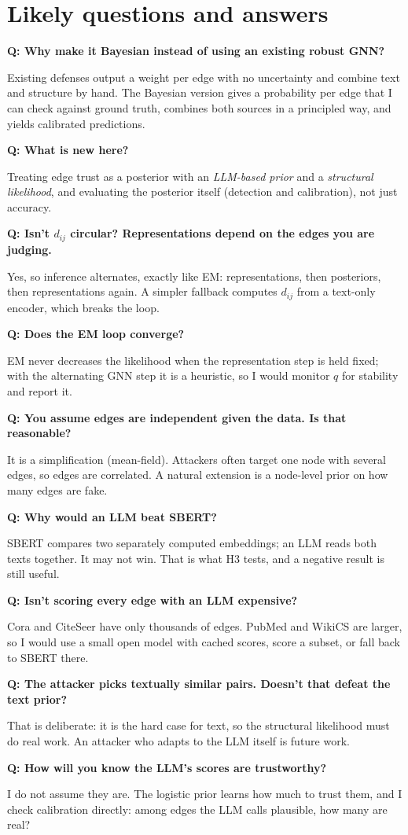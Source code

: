 \documentclass[11pt]{article}
\newcommand{\q}[1]{\par\medskip\noindent\textbf{\color{accent}Q: #1}\par\noindent}
\begin{document}
\section{Likely questions and answers}

\q{Why make it Bayesian instead of using an existing robust GNN?}
Existing defenses output a weight per edge with no uncertainty and combine text and structure
by hand. The Bayesian version gives a probability per edge that I can check against ground
truth, combines both sources in a principled way, and yields calibrated predictions.

\q{What is new here?}
Treating edge trust as a posterior with an \emph{LLM-based prior} and a \emph{structural
likelihood}, and evaluating the posterior itself (detection and calibration), not just
accuracy.

\q{Isn't $d_{ij}$ circular? Representations depend on the edges you are judging.}
Yes, so inference alternates, exactly like EM: representations, then posteriors, then
representations again. A simpler fallback computes $d_{ij}$ from a text-only encoder, which
breaks the loop.

\q{Does the EM loop converge?}
EM never decreases the likelihood when the representation step is held fixed; with the
alternating GNN step it is a heuristic, so I would monitor $q$ for stability and report it.

\q{You assume edges are independent given the data. Is that reasonable?}
It is a simplification (mean-field). Attackers often target one node with several edges, so
edges are correlated. A natural extension is a node-level prior on how many edges are fake.

\q{Why would an LLM beat SBERT?}
SBERT compares two separately computed embeddings; an LLM reads both texts together. It may
not win. That is what H3 tests, and a negative result is still useful.

\q{Isn't scoring every edge with an LLM expensive?}
Cora and CiteSeer have only thousands of edges. PubMed and WikiCS are larger, so I would use
a small open model with cached scores, score a subset, or fall back to SBERT there.

\q{The attacker picks textually similar pairs. Doesn't that defeat the text prior?}
That is deliberate: it is the hard case for text, so the structural likelihood must do real
work. An attacker who adapts to the LLM itself is future work.

\q{How will you know the LLM's scores are trustworthy?}
I do not assume they are. The logistic prior learns how much to trust them, and I check
calibration directly: among edges the LLM calls plausible, how many are real?
\end{document}
